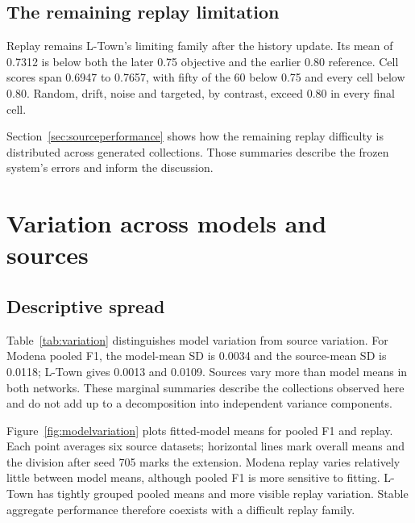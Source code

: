\subsection{The remaining replay limitation}
Replay remains L-Town's limiting family after the history update. Its mean of 0.7312 is below both the later 0.75 objective and the earlier 0.80 reference. Cell scores span 0.6947 to 0.7657, with fifty of the 60 below 0.75 and every cell below 0.80. Random, drift, noise and targeted, by contrast, exceed 0.80 in every final cell.

Section~\ref{sec:sourceperformance} shows how the remaining replay difficulty is distributed across generated collections. Those summaries describe the frozen system's errors and inform the discussion.

\FloatBarrier
\section{Variation across models and sources}
\subsection{Descriptive spread}
Table~\ref{tab:variation} distinguishes model variation from source variation. For Modena pooled F1, the model-mean SD is 0.0034 and the source-mean SD is 0.0118; L-Town gives 0.0013 and 0.0109. Sources vary more than model means in both networks. These marginal summaries describe the collections observed here and do not add up to a decomposition into independent variance components.



Figure~\ref{fig:modelvariation} plots fitted-model means for pooled F1 and replay. Each point averages six source datasets; horizontal lines mark overall means and the division after seed 705 marks the extension. Modena replay varies relatively little between model means, although pooled F1 is more sensitive to fitting. L-Town has tightly grouped pooled means and more visible replay variation. Stable aggregate performance therefore coexists with a difficult replay family.


